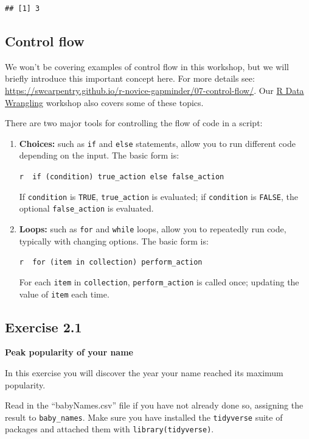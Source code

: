 \documentclass[]{book}
\begin{document}
\begin{verbatim}
## [1] 3
\end{verbatim}

\subsection{Control flow}\label{control-flow}

We won't be covering examples of control flow in this workshop, but we
will briefly introduce this important concept here. For more details
see:
\url{https://swcarpentry.github.io/r-novice-gapminder/07-control-flow/}.
Our \href{./RDataWrangling.html}{R Data Wrangling} workshop also covers
some of these topics.

There are two major tools for controlling the flow of code in a script:

\begin{enumerate}
\def\labelenumi{\arabic{enumi}.}
\item
  \textbf{Choices:} such as \texttt{if} and \texttt{else} statements,
  allow you to run different code depending on the input. The basic form
  is:

  \texttt{r\ \ if\ (condition)\ true\_action\ else\ false\_action}

  If \texttt{condition} is \texttt{TRUE}, \texttt{true\_action} is
  evaluated; if \texttt{condition} is \texttt{FALSE}, the optional
  \texttt{false\_action} is evaluated.
\item
  \textbf{Loops:} such as \texttt{for} and \texttt{while} loops, allow
  you to repeatedly run code, typically with changing options. The basic
  form is:

  \texttt{r\ \ for\ (item\ in\ collection)\ perform\_action}

  For each \texttt{item} in \texttt{collection},
  \texttt{perform\_action} is called once; updating the value of
  \texttt{item} each time.
\end{enumerate}

\subsection{Exercise 2.1}\label{exercise-2.1}

\textbf{Peak popularity of your name}

In this exercise you will discover the year your name reached its
maximum popularity.

Read in the ``babyNames.csv'' file if you have not already done so,
assigning the result to \texttt{baby\_names}. Make sure you have
installed the \texttt{tidyverse} suite of packages and attached them
with \texttt{library(tidyverse)}.
\end{document}
